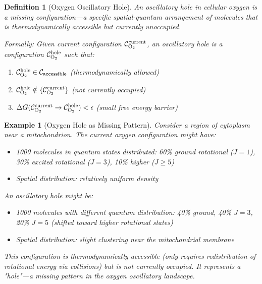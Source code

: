 \documentclass[12pt,a4paper]{article}
\newtheorem{definition}{Definition}
\newtheorem{example}{Example}
\begin{document}
\begin{definition}[Oxygen Oscillatory Hole]
\label{def:oxygen_hole}
An oscillatory hole in cellular oxygen is a \textit{missing configuration}—a specific spatial-quantum arrangement of  molecules that is thermodynamically accessible but currently unoccupied.

Formally: Given current configuration $\mathcal{C}_{\ce{O2}}^{\text{current}}$, an oscillatory hole is a configuration $\mathcal{C}_{\ce{O2}}^{\text{hole}}$ such that:
\begin{enumerate}
\item $\mathcal{C}_{\ce{O2}}^{\text{hole}} \in \mathcal{C}_{\text{accessible}}$ (thermodynamically allowed)
\item $\mathcal{C}_{\ce{O2}}^{\text{hole}} \notin \{\mathcal{C}_{\ce{O2}}^{\text{current}}\}$ (not currently occupied)
\item $\Delta G(\mathcal{C}_{\ce{O2}}^{\text{current}} \to \mathcal{C}_{\ce{O2}}^{\text{hole}}) < \epsilon$ (small free energy barrier)
\end{enumerate}
\end{definition}

\begin{example}[Oxygen Hole as Missing Pattern]
Consider a region of cytoplasm near a mitochondrion. The current oxygen configuration might have:
\begin{itemize}
\item 1000  molecules in quantum states distributed: 60\% ground rotational ($J=1$), 30\% excited rotational ($J=3$), 10\% higher ($J \geq 5$)
\item Spatial distribution: relatively uniform density
\end{itemize}

An oscillatory hole might be:
\begin{itemize}
\item 1000  molecules with \textit{different} quantum distribution: 40\% ground, 40\% $J=3$, 20\% $J=5$ (shifted toward higher rotational states)
\item Spatial distribution: slight clustering near the mitochondrial membrane
\end{itemize}

This configuration is thermodynamically accessible (only requires redistribution of rotational energy via collisions) but is not currently occupied. It represents a "hole"—a missing pattern in the oxygen oscillatory landscape.
\end{example}
\end{document}

